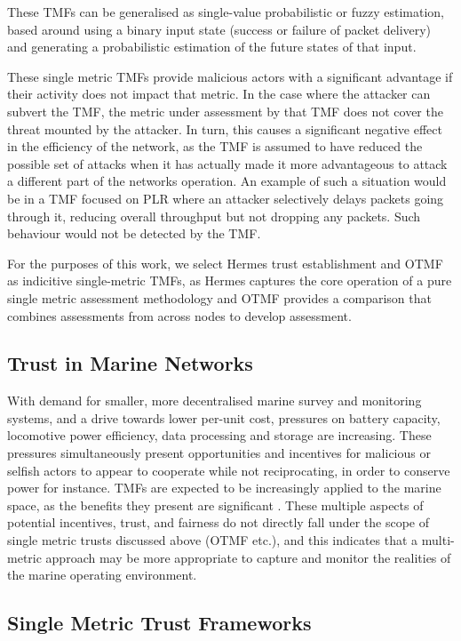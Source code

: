 \documentclass[conference]{IEEEtran}
\begin{document}
These TMFs can be generalised as single-value probabilistic or fuzzy estimation, based around using a binary input state (success or failure of packet delivery) and generating a probabilistic estimation of the future states of that input. 

These single metric TMFs provide malicious actors with a significant advantage if their activity does not impact that metric.
In the case where the attacker can subvert the TMF, the metric under assessment by that TMF does not cover the threat mounted by the attacker.
In turn, this causes a significant negative effect in the efficiency of the network, as the TMF is assumed to have reduced the possible set of attacks when it has actually made it more advantageous to attack a different part of the networks operation.
An example of such a situation would be in a TMF focused on PLR where an attacker selectively delays packets going through it, reducing overall throughput but not dropping any packets.
Such behaviour would not be detected by the TMF.

For the purposes of this work, we select Hermes trust establishment and OTMF as indicitive single-metric TMFs, as Hermes captures the core operation of a pure single metric assessment methodology and OTMF provides a comparison that combines assessments from across nodes to develop assessment.


\subsection{Trust in Marine Networks}\label{sec:trust_in_marine}

With demand for smaller, more decentralised marine survey and monitoring systems, and a drive towards lower per-unit cost, pressures on battery capacity, locomotive power efficiency, data processing and storage are increasing.
These pressures simultaneously present opportunities and incentives for malicious or selfish actors to appear to cooperate while not reciprocating, in order to conserve power for instance.
TMFs are expected to be increasingly applied to the marine space, as the benefits they present are significant \cite{Pavan2015}.
These multiple aspects of potential incentives, trust, and fairness do not directly fall under the scope of single metric trusts discussed above (OTMF etc.), and this indicates that a multi-metric approach may be more appropriate to capture and monitor the realities of the marine operating environment.


\subsection{Single Metric Trust Frameworks}
\end{document}
